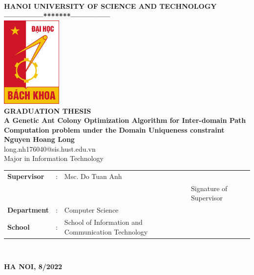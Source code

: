 \thispagestyle{empty}
%
\begin{center}

{
{\fontsize{14}{12}\selectfont \textbf{HANOI UNIVERSITY OF SCIENCE AND TECHNOLOGY}}\\
\textbf{---------------*******---------------}\\[1cm]
\includegraphics[width=3cm]{Figures/bklogo.jpg}
\centering
\\[1cm]
{\fontsize{25}{43}\selectfont \textbf{GRADUATION THESIS}}\\[0.3cm]
{\fontsize{21.3}{30}\selectfont \textbf{A Genetic Ant Colony Optimization Algorithm for Inter-domain Path Computation problem under the Domain Uniqueness constraint}}\\[0.3cm]
{\fontsize{14}{20}\selectfont \textbf{Nguyen Hoang Long} \\
\fontsize{13}{18}\selectfont long.nh176040@sis.hust.edu.vn}\\[0.3cm]

{\fontsize{17}{10}\selectfont Major in Information Technology}\\[1.5cm]

\vspace*{1\baselineskip}  
\begin{tabular}{l c l l}
  \textbf{Supervisor} & : &  Msc. Do Tuan Anh & \text{\_\_\_\_\_\_\_\_\_\_\_\_\_\_\_\_\_\_\_\_} \\
  & & & \fontsize{10}{10}\selectfont Signature of Supervisor\\
  \textbf{Department} & : &  Computer Science \\
  \textbf{School} & : &  School of Information and Communication Technology \\
\end{tabular} \\[3cm]
}

\vspace*{1\baselineskip}  
\fontsize{15}{19}\selectfont \textbf{HA NOI, 8/2022}
\end{center}
\pagebreak
